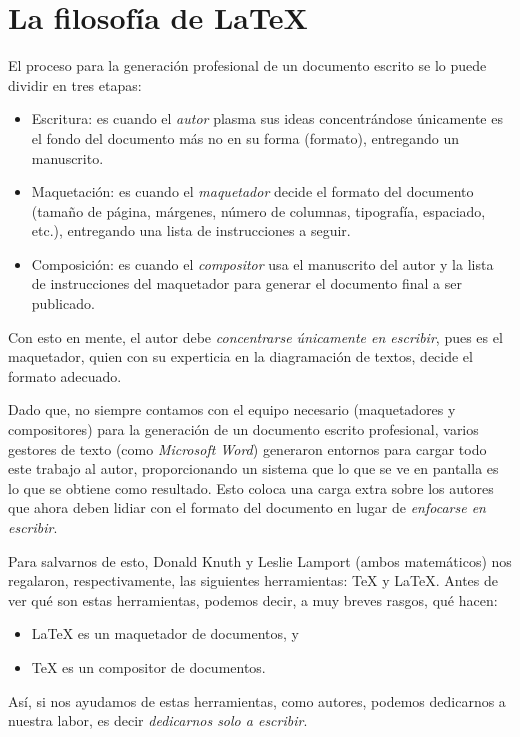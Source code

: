 \documentclass[a4,11pt]{aleph-notas-alpha}
\begin{document}
\encabezado

\informacion

\tableofcontents

\newpage
\vspace*{-18mm}
\section{La filosofía de \LaTeX}

El proceso para la generación profesional de un documento escrito se lo puede dividir en tres etapas:
\begin{itemize}
\item 
    Escritura: es cuando el \textit{autor} plasma sus ideas concentrándose únicamente es el fondo del documento más no en su forma (formato), entregando un manuscrito.
\item
    Maquetación: es cuando el \textit{maquetador} decide el formato del documento (tamaño de página, márgenes, número de columnas, tipografía, espaciado, etc.), entregando una lista de instrucciones a seguir.
\item
    Composición: es cuando el \textit{compositor} usa el manuscrito del autor y la lista de instrucciones del maquetador para generar el documento final a ser publicado.
\end{itemize}
Con esto en mente, el autor debe \textit{concentrarse únicamente en escribir}, pues es el maquetador, quien con su experticia en la diagramación de textos, decide el formato adecuado. 

Dado que, no siempre contamos con el equipo necesario (maquetadores y compositores) para la generación de un documento escrito profesional, varios gestores de texto (como \textit{Microsoft Word}) generaron entornos para cargar todo este trabajo al autor, proporcionando un sistema que lo que se ve en pantalla es lo que se obtiene como resultado. Esto coloca una carga extra sobre los autores que ahora deben lidiar con el formato del documento en lugar de \textit{enfocarse en escribir}.

Para salvarnos de esto, Donald Knuth y Leslie Lamport (ambos matemáticos) nos regalaron, respectivamente, las siguientes herramientas: \TeX{} y \LaTeX{}. Antes de ver qué son estas herramientas, podemos decir, a muy breves rasgos, qué hacen:
\begin{itemize}
\item 
    \LaTeX{} es un maquetador de documentos, y
\item
    \TeX{} es un compositor de documentos.
\end{itemize}
Así, si nos ayudamos de estas herramientas, como autores, podemos dedicarnos a nuestra labor, es decir \textit{dedicarnos solo a escribir}.
\end{document}
